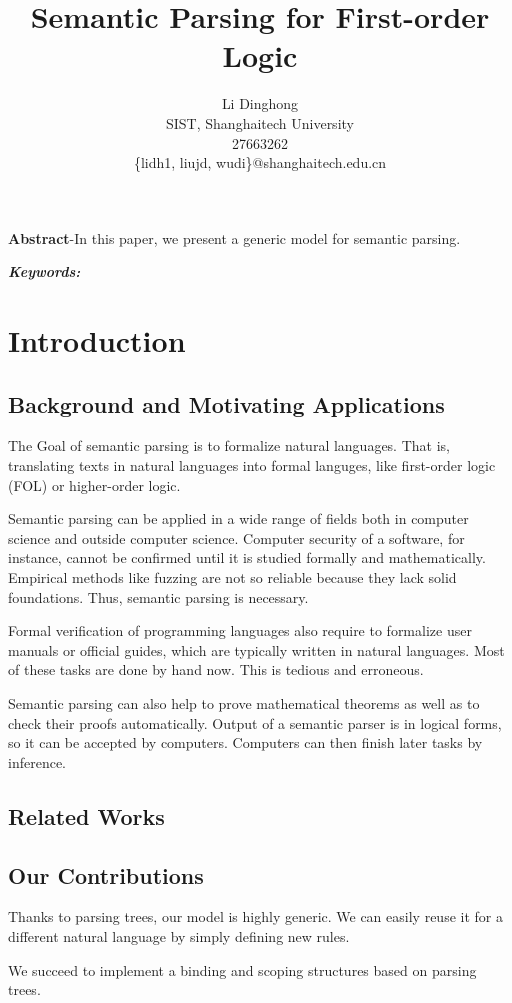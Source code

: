 \documentclass{article}
\title{Semantic Parsing for First-order Logic}
\author{
	Li Dinghong\\
	SIST, Shanghaitech University\\
	27663262\\
	\{lidh1, liujd, wudi\}@shanghaitech.edu.cn
}
\begin{document}
{
	\newpage
	\maketitle

	\textbf{Abstract}-{In this paper, we present a generic model for semantic parsing. }

	\vspace{5pt}
	\textbf{\emph{Keywords:}} {}

	\tableofcontents
}

\section{Introduction}{
	\subsection{Background and Motivating Applications}{
		The Goal of semantic parsing is to formalize natural languages. That is, translating texts in natural languages into formal languges, like first-order logic (FOL) or higher-order logic. 

		Semantic parsing can be applied in a wide range of fields both in computer science and outside computer science. Computer security of a software, for instance, cannot be confirmed until it is studied formally and mathematically. Empirical methods like fuzzing are not so reliable because they lack solid foundations. Thus, semantic parsing is necessary. 

		Formal verification of programming languages also require to formalize user manuals or official guides, which are typically written in natural languages. Most of these tasks are done by hand now. This is tedious and erroneous. 

		Semantic parsing can also help to prove mathematical theorems as well as to check their proofs automatically. Output of a semantic parser is in logical forms, so it can be accepted by computers. Computers can then finish later tasks by inference. 
	}

	\subsection{Related Works}{}

	\subsection{Our Contributions}{
		Thanks to parsing trees, our model is highly generic. We can easily reuse it for a different natural language by simply defining new rules. 

		We succeed to implement a binding and scoping structures based on parsing trees. 
	}
}
\end{document}
